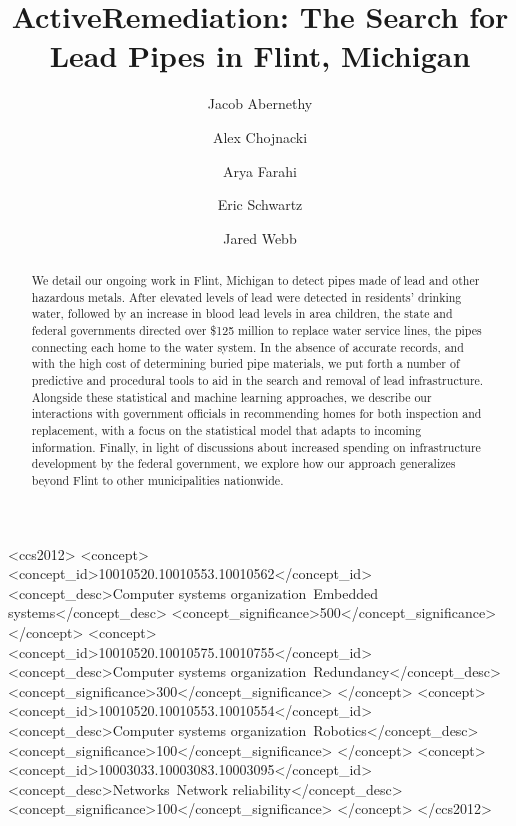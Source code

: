 \documentclass[sigconf]{acmart}
\author{Jacob Abernethy}
\affiliation{%
  \institution{Georgia Institute of Technology \&}
  \institution{University of Michigan}
}
\author{Alex Chojnacki}
\affiliation{%
  \institution{University of Michigan}
}
\author{Arya Farahi}
\affiliation{%
  \institution{University of Michigan}
}
\author{Eric Schwartz}
\affiliation{%
  \institution{University of Michigan}
}
\author{Jared Webb}
\affiliation{%
  \institution{Brigham Young University}
}
\begin{document}
\title{ActiveRemediation: The Search for Lead Pipes in Flint, Michigan}



\renewcommand{\shortauthors}{J. Abernethy et al.}

\begin{abstract}
  We detail our ongoing work in Flint, Michigan to detect pipes made of lead and other hazardous metals. After elevated levels of lead were detected in residents' drinking water, followed by an increase in blood lead levels in area children, the state and federal governments directed over \$125 million to replace water service lines, the pipes connecting each home to the water system. In the absence of accurate records, and with the high cost of determining buried pipe materials, we put forth a number of predictive and procedural tools to aid in the search and removal of lead infrastructure. Alongside these statistical and machine learning approaches, we describe our interactions with government officials in recommending homes for both inspection and replacement, with a focus on the statistical model that adapts to incoming information. Finally, in light of discussions about increased spending on infrastructure development by the federal government, we explore how our approach generalizes beyond Flint to other municipalities nationwide.
\end{abstract}

%
%
\begin{CCSXML}
<ccs2012>
 <concept>
  <concept_id>10010520.10010553.10010562</concept_id>
  <concept_desc>Computer systems organization~Embedded systems</concept_desc>
  <concept_significance>500</concept_significance>
 </concept>
 <concept>
  <concept_id>10010520.10010575.10010755</concept_id>
  <concept_desc>Computer systems organization~Redundancy</concept_desc>
  <concept_significance>300</concept_significance>
 </concept>
 <concept>
  <concept_id>10010520.10010553.10010554</concept_id>
  <concept_desc>Computer systems organization~Robotics</concept_desc>
  <concept_significance>100</concept_significance>
 </concept>
 <concept>
  <concept_id>10003033.10003083.10003095</concept_id>
  <concept_desc>Networks~Network reliability</concept_desc>
  <concept_significance>100</concept_significance>
 </concept>
</ccs2012>
\end{CCSXML}
\end{document}
